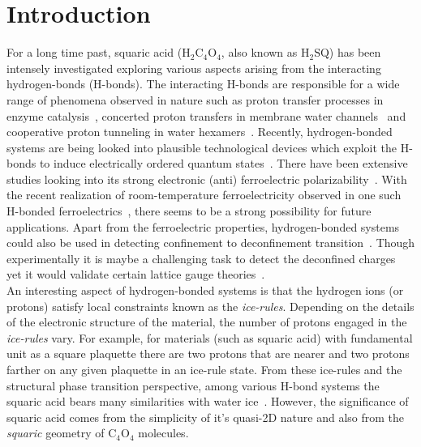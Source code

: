 \section{Introduction}
\label{intro}
\indent
For a long time past, squaric acid ($\text{H}_2\text{C}_4\text{O}_4$, also known as $\text{H}_2\text{SQ}$) has been intensely investigated  exploring  various  aspects arising from the interacting hydrogen-bonds (H-bonds). The interacting H-bonds are responsible for a wide range of phenomena observed in nature such as proton transfer processes in enzyme catalysis~\cite{mathias2007structures}, concerted proton transfers in membrane water channels~\cite{brewer2001formation,dellago2003proton} and cooperative proton tunneling in water hexamers~\cite{chen2013nature,bove2009anomalous}. Recently, hydrogen-bonded systems are being looked into plausible technological devices which exploit the H-bonds to induce electrically ordered quantum states~\cite{lengyel2019}. There have been extensive studies looking into its strong electronic (anti) ferroelectric polarizability~\cite{fjaer1980light,petersson1980phase,horiuchi2018strong,dolin2011quantum,horiuchi2008organic,horiuchi2020hydrogen}. With the recent realization of room-temperature ferroelectricity observed in one such H-bonded ferroelectrics~\cite{horiuchi2005ferroelectricity,horiuchi2012above}, there seems to be a strong possibility for future applications. Apart from the ferroelectric properties, hydrogen-bonded systems could also be used in detecting confinement to deconfinement transition~\cite{huang2017deconfinement}. Though experimentally it is maybe a challenging task to detect the deconfined charges~\cite{huang2017deconfinement} yet it would validate certain lattice gauge theories~\cite{chern2014gauge}. \\
\indent An interesting aspect of hydrogen-bonded systems is that the hydrogen ions (or protons) satisfy local constraints known as the \textit{ice-rules}. Depending on the details of the electronic structure of the material, the number of protons engaged in the \textit{ice-rules} vary. For example, for materials (such as squaric acid) with fundamental unit as a square plaquette there are two protons that are nearer and two protons farther on any given plaquette in an ice-rule state. From these ice-rules and the structural phase transition perspective, among various H-bond systems the squaric acid bears many similarities with water ice~\cite{benton2016classical}. However, the significance of squaric acid comes from the simplicity of it's quasi-2D nature and also from the \textit{squaric} geometry of $\text{C}_4\text{O}_4$ molecules.\\%
